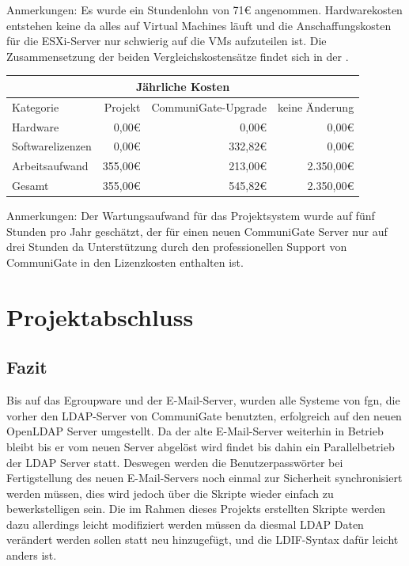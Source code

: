 \documentclass[11pt,a4paper,titlepage=firstiscover,headsepline,bibtotoc]{scrartcl} %
\newcommand{\mcc}[2]{\multicolumn{#1}{|c|}{#2}} %
\begin{document}
\medskip \noindent Anmerkungen: Es wurde ein Stundenlohn von 71\euro{} angenommen. Hardwarekosten entstehen keine da alles auf Virtual Machines läuft und die Anschaffungskosten für die ESXi-Server nur schwierig auf die VMs aufzuteilen ist. Die Zusammensetzung der beiden Vergleichskostensätze findet sich in der .

\bigskip\noindent
\begin{tabularx}{\textwidth}{|X|r|r|r|}
\hline
\mcc{4}{Jährliche Kosten}\\
\hline
Kategorie	&	Projekt &	CommuniGate-Upgrade &	keine Änderung\\
\hline
Hardware &	0,00\euro{} &	0,00\euro{} &	0,00\euro{}\\
\hline
Softwarelizenzen &	0,00\euro{} &	332,82\euro{} &	0,00\euro{}\\
\hline
Arbeitsaufwand &	355,00\euro{} &	213,00\euro{} &	2.350,00\euro{}\\
\hhline{|=|=|=|=|}
Gesamt &	355,00\euro{} &	545,82\euro{} &	2.350,00\euro{}\\
\hline
\end{tabularx}

\medskip \noindent Anmerkungen: Der Wartungsaufwand für das Projektsystem wurde auf fünf Stunden pro Jahr geschätzt, der für einen neuen CommuniGate Server nur auf drei Stunden da Unterstützung durch den professionellen Support von CommuniGate in den Lizenzkosten enthalten ist.

\section{Projektabschluss}
\subsection{Fazit}
Bis auf das Egroupware und der E-Mail-Server, wurden alle Systeme von fgn, die vorher den LDAP-Server von CommuniGate benutzten, erfolgreich auf den neuen OpenLDAP Server umgestellt. Da der alte E-Mail-Server weiterhin in Betrieb bleibt bis er vom neuen Server abgelöst wird findet bis dahin ein Parallelbetrieb der LDAP Server statt. Deswegen werden die Benutzerpasswörter bei Fertigstellung des neuen E-Mail-Servers noch einmal zur Sicherheit synchronisiert werden müssen, dies wird jedoch über die Skripte wieder einfach zu bewerkstelligen sein. Die im Rahmen dieses Projekts erstellten Skripte werden dazu allerdings leicht modifiziert werden müssen da diesmal LDAP Daten verändert werden sollen statt neu hinzugefügt, und die LDIF-Syntax dafür leicht anders ist.
\end{document}
